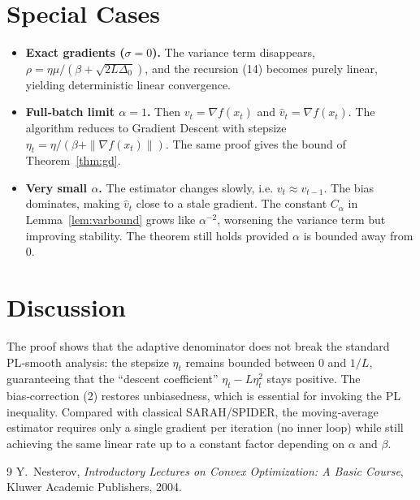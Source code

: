 \documentclass{article}
\begin{document}
\section*{Special Cases}
\begin{itemize}
  \item \textbf{Exact gradients ($\sigma=0$).}
        The variance term disappears, $\rho=\eta\mu/(\beta+\sqrt{2L\Delta_{0}})$,
        and the recursion (14) becomes purely linear,
        yielding deterministic linear convergence.
  \item \textbf{Full‑batch limit $\alpha=1$.}
        Then $v_{t}=\nabla f(x_{t})$ and $\hat v_{t}= \nabla f(x_{t})$.
        The algorithm reduces to Gradient Descent with stepsize
        $\eta_{t}= \eta/(\beta+\|\nabla f(x_{t})\|)$.
        The same proof gives the bound of Theorem~\ref{thm:gd}.
  \item \textbf{Very small $\alpha$.}
        The estimator changes slowly, i.e. $v_{t}\approx v_{t-1}$.
        The bias dominates, making $\hat v_{t}$ close to a stale gradient.
        The constant $C_{\alpha}$ in Lemma~\ref{lem:varbound} grows like
        $\alpha^{-2}$, worsening the variance term but improving stability.
        The theorem still holds provided $\alpha$ is bounded away from $0$.
\end{itemize}

\section*{Discussion}
The proof shows that the adaptive denominator does not break the
standard PL‑smooth analysis: the stepsize $\eta_{t}$ remains bounded
between $0$ and $1/L$, guaranteeing that the ``descent coefficient''
$\eta_{t}-L\eta_{t}^{2}$ stays positive.  The bias‑correction (2) restores
unbiasedness, which is essential for invoking the PL inequality.
Compared with classical SARAH/SPIDER, the moving‑average estimator
requires only a single gradient per iteration (no inner loop) while still
achieving the same linear rate up to a constant factor depending on
$\alpha$ and $\beta$.

\begin{thebibliography}{9}
Y.~Nesterov, \emph{Introductory Lectures on Convex Optimization:
A Basic Course}, Kluwer Academic Publishers, 2004.
\end{thebibliography}
\end{document}
